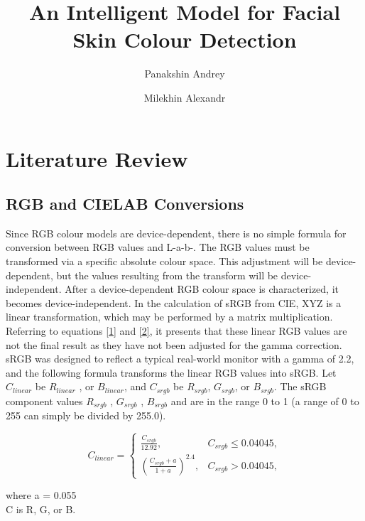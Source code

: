 \documentclass[acmsmall]{acmart}
\begin{document}
\title{An Intelligent Model for Facial Skin Colour Detection}


\author{Panakshin Andrey}
\author{Milekhin Alexandr}


\maketitle

\section{Literature Review}
\subsection{RGB and CIELAB Conversions}
Since RGB colour models are device-dependent, there is no simple formula for conversion between RGB values and L-a-b-. The RGB values must be transformed via a specific absolute colour space. This adjustment will be device-dependent, but the values resulting from the transform will be device-independent. After a device-dependent RGB colour space is characterized, it becomes device-independent. In the calculation of sRGB from CIE, XYZ is a linear transformation, which may be performed by a matrix multiplication. Referring to equations \ref{1} and \ref{2}, it presents that these linear RGB values are not the final result as they have not been adjusted for the gamma correction. sRGB was designed to reflect a typical real-world monitor with a gamma of 2.2, and the following formula transforms the linear RGB values into sRGB. Let $C_{linear}$ be $R_{linear}$  , or $B_{linear}$, and $C_{srgb}$  be $R_{srgb}$, $G_{srgb}$, or $B_{srgb}$. The sRGB component values $R_{srgb}$ , $G_{srgb}$ , $B_{srgb}$ and are in the range 0 to 1 (a range of 0 to 255 can simply be divided by 255.0).

\begin{equation}\label{1}
\ C_{linear}=
\begin{cases}
\frac{C_{srgb}}{12.92}, & C_{srgb} \leq 0.04045,\\
\left(\frac{C_{srgb}+a}{1+a}\right)^{2.4}, & C_{srgb} > 0.04045,
\frac{}{}

\end{cases}
\end{equation}

\noindent where a = 0.055 \\
\noindent C is R, G, or B. 
\end{document}
